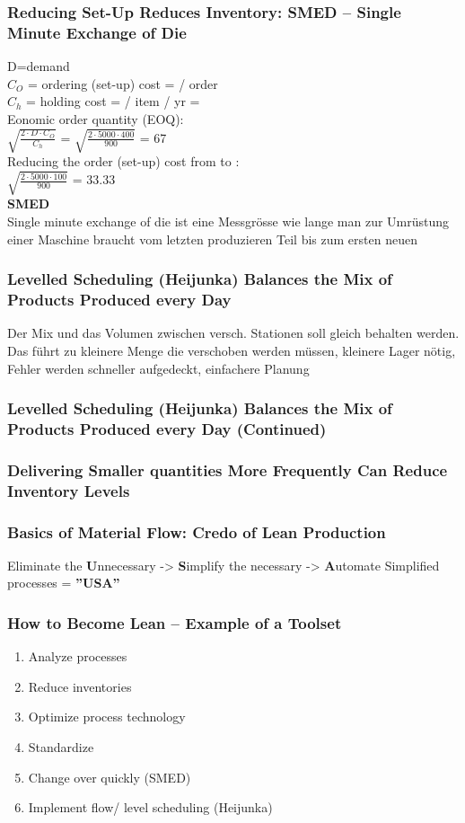 \subsubsection{Reducing Set-Up Reduces Inventory: SMED – Single Minute Exchange of Die}
D=demand\\
$C_O$ = ordering (set-up) cost =  / order\\
$C_h$ = holding cost =  / item / yr = \\
Eonomic order quantity (EOQ):\\
$\sqrt{\frac{2 \cdot D \cdot C_O}{C_h}}$ = $\sqrt{\frac{2 \cdot 5000 \cdot 400}{900}}$ = 67 \\
Reducing the order (set-up) cost from  to :\\
$\sqrt{\frac{2 \cdot 5000 \cdot 100}{900}}$ = 33.33\\
\textbf{SMED}\\
Single minute exchange of die ist eine Messgr\"osse wie lange man zur Umr\"ustung einer Maschine braucht vom letzten produzieren Teil bis zum ersten neuen
\subsubsection{Levelled Scheduling (Heijunka) Balances the Mix of Products Produced every Day}
Der Mix und das Volumen zwischen versch. Stationen soll gleich behalten werden. Das f\"uhrt zu kleinere Menge die verschoben werden m\"ussen, kleinere Lager n\"otig, Fehler werden schneller aufgedeckt, einfachere Planung
\subsubsection{Levelled Scheduling (Heijunka) Balances the Mix of Products Produced every Day (Continued)}
\subsubsection{Delivering Smaller quantities More Frequently Can Reduce Inventory Levels}
\subsubsection{Basics of Material Flow: Credo of Lean Production}
Eliminate the \textbf{U}nnecessary -> \textbf{S}implify the necessary -> \textbf{A}utomate Simplified processes = \textbf{''USA''}
\subsubsection{How to Become Lean – Example of a Toolset }\label{sssec:becomelean}
\begin{enumerate}
	\item Analyze processes
	\item Reduce inventories
	\item Optimize process technology
	\item Standardize
	\item Change over quickly (SMED)
	\item Implement flow/ level scheduling (Heijunka)
\end{enumerate}
